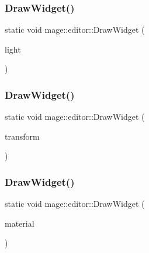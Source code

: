 \hypertarget{namespacemage_1_1editor_ad905a3a02d4abac8d53987f027bdf172}{}\label{namespacemage_1_1editor_ad905a3a02d4abac8d53987f027bdf172} 
\subsubsection{\texorpdfstring{Draw\+Widget()}{DrawWidget()}\hspace{0.1cm}{\footnotesize\ttfamily [12/20]}}
{\footnotesize\ttfamily static void mage\+::editor\+::\+Draw\+Widget (\begin{DoxyParamCaption}\item[{\hyperlink{classmage_1_1_spot_light}{Spot\+Light} \&}]{light }\end{DoxyParamCaption})\hspace{0.3cm}{\ttfamily [static]}}

\hypertarget{namespacemage_1_1editor_a756fb73ee6d0c207c1bf9c317ca5c3be}{}\label{namespacemage_1_1editor_a756fb73ee6d0c207c1bf9c317ca5c3be} 
\subsubsection{\texorpdfstring{Draw\+Widget()}{DrawWidget()}\hspace{0.1cm}{\footnotesize\ttfamily [13/20]}}
{\footnotesize\ttfamily static void mage\+::editor\+::\+Draw\+Widget (\begin{DoxyParamCaption}\item[{\hyperlink{classmage_1_1_texture_transform}{Texture\+Transform} \&}]{transform }\end{DoxyParamCaption})\hspace{0.3cm}{\ttfamily [static]}}

\hypertarget{namespacemage_1_1editor_ac832c9e938c5f40096064ec44dbbe955}{}\label{namespacemage_1_1editor_ac832c9e938c5f40096064ec44dbbe955} 
\subsubsection{\texorpdfstring{Draw\+Widget()}{DrawWidget()}\hspace{0.1cm}{\footnotesize\ttfamily [14/20]}}
{\footnotesize\ttfamily static void mage\+::editor\+::\+Draw\+Widget (\begin{DoxyParamCaption}\item[{\hyperlink{classmage_1_1_material}{Material} \&}]{material }\end{DoxyParamCaption})\hspace{0.3cm}{\ttfamily [static]}}

